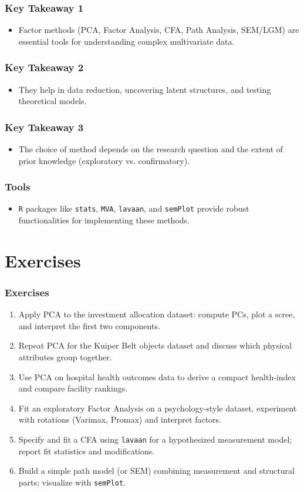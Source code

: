 \documentclass{beamer}
\newcommand{\code}[1]{\texttt{#1}}
\begin{document}
\begin{frame}
    \frametitle{Key Takeaway 1}
    \begin{itemize}
        \item Factor methods (PCA, Factor Analysis, CFA, Path Analysis, SEM/LGM) are essential tools for understanding complex multivariate data.
    \end{itemize}
\end{frame}

\begin{frame}
    \frametitle{Key Takeaway 2}
    \begin{itemize}
        \item They help in \alert{data reduction}, uncovering \alert{latent structures}, and \alert{testing theoretical models}.
    \end{itemize}
\end{frame}

\begin{frame}
    \frametitle{Key Takeaway 3}
    \begin{itemize}
        \item The choice of method depends on the research question and the extent of prior knowledge (exploratory vs. confirmatory).
    \end{itemize}
\end{frame}

\begin{frame}
    \frametitle{Tools}
    \begin{itemize}
        \item \code{R} packages like \code{stats}, \code{MVA}, \code{lavaan}, and \code{semPlot} provide robust functionalities for implementing these methods.
    \end{itemize}
\end{frame}
\section{Exercises}

\begin{frame}
    \frametitle{Exercises}
    \begin{enumerate}
        \item Apply PCA to the investment allocation dataset: compute PCs, plot a scree, and interpret the first two components.
        \item Repeat PCA for the Kuiper Belt objects dataset and discuss which physical attributes group together.
        \item Use PCA on hospital health outcomes data to derive a compact health-index and compare facility rankings.
        \item Fit an exploratory Factor Analysis on a psychology-style dataset, experiment with rotations (Varimax, Promax) and interpret factors.
        \item Specify and fit a CFA using \code{lavaan} for a hypothesized measurement model; report fit statistics and modifications.
        \item Build a simple path model (or SEM) combining measurement and structural parts; visualize with \code{semPlot}.
    \end{enumerate}
\end{frame}
\end{document}
